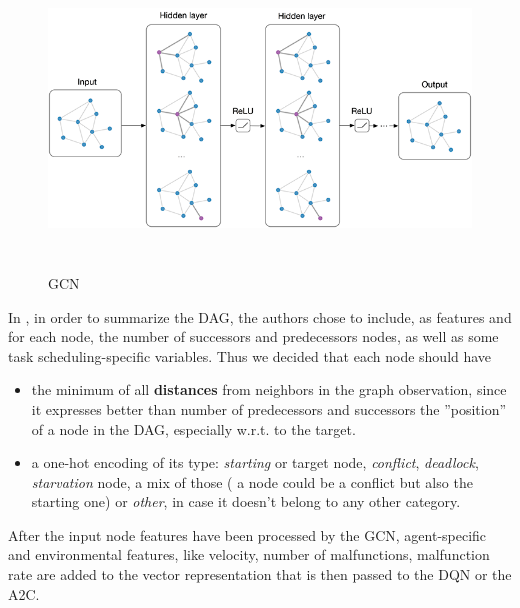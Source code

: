 \begin{figure}[H] 
\includegraphics[height=80mm, width=140mm, scale=0.5]{chapters/gcn.png}
\centering
\caption{GCN}
\label{fig:s5} 
\end{figure}
\noindent
In \cite{a2c}, in order to summarize the DAG, the authors chose to include, as features and for each node, the number of successors and predecessors nodes, as well as some task scheduling-specific variables. Thus we decided that each node should have
\begin{itemize}
\item the minimum of all \textbf{distances} from neighbors in the graph observation, since it expresses better than number of predecessors and successors the ''position'' of a node in the DAG, especially w.r.t. to the target.
\item a one-hot encoding of its type: \textit{starting} or target node, \textit{conflict}, \textit{deadlock}, \textit{starvation} node, a mix of those ( a node could be a conflict but also the starting one) or \textit{other}, in case it doesn't belong to any other category.

\end{itemize}
\noindent
After the input node features have been processed by the GCN, agent-specific and environmental features, like velocity, number of malfunctions, malfunction rate are added to the vector representation that is then passed to the DQN or the A2C.
